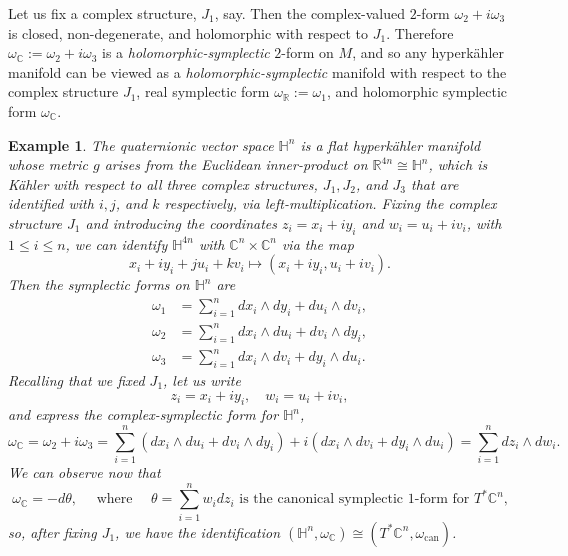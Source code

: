 \documentclass{amsart}
\newtheorem{example}{Example}
\newcommand{\w}{\omega}
\newcommand{\RR}{\mathbb{R}}
\newcommand{\CC}{\mathbb{C}}
\newcommand{\HH}{\mathbb{H}}
\begin{document}
	Let us fix a complex structure, $J_{1}$, say. Then the complex-valued $2$-form $\w_{2} + i\w_{3}$ is closed, non-degenerate, and holomorphic with respect to $J_{1}$. Therefore $\w_{\CC} := \w_{2} + i\w_{3}$ is a \emph{holomorphic-symplectic} $2$-form on $M$, and so any hyperk\"ahler manifold can be viewed as a \emph{holomorphic-symplectic} manifold with respect to the complex structure $J_{1}$, real symplectic form $\w_{\RR} := \w_{1}$, and holomorphic symplectic form $\w_{\CC}$.
	
	\begin{example}
		The quaternionic vector space $\HH^{n}$ is a flat hyperk\"ahler manifold whose metric $g$ arises from the Euclidean inner-product on $\RR^{4n}\cong \HH^{n}$, which is K\"ahler with respect to all three complex structures, $J_{1}, J_{2}$, and $J_{3}$ that are identified with $i, j$, and $k$ respectively, via left-multiplication. Fixing the complex structure $J_{1}$ and introducing the coordinates $z_{i} = x_{i} + i y_{i}$ and $w_{i} = u_{i} + i v_{i}$, with $1 \leq i \leq n$, we can identify $\HH^{4n}$ with $\CC^{n} \times \CC^{n}$ via the map
		\[
		x_{i} + iy_{i} + ju_{i} + kv_{i} \mapsto (x_{i} + iy_{i}, u_{i} + iv_{i}).
		\]
		Then the symplectic forms on $\HH^{n}$ are
		\begin{equation*}
			\begin{split}
				\w_{1} &= \sum_{i=1}^{n} dx_{i} \wedge dy_{i} + du_{i} \wedge dv_{i}, \\
				\w_{2} &= \sum_{i=1}^{n} dx_{i} \wedge du_{i} + dv_{i} \wedge dy_{i}, \\
				\w_{3} &= \sum_{i=1}^{n} dx_{i} \wedge dv_{i} + dy_{i} \wedge du_{i}.
			\end{split}
		\end{equation*}
		Recalling that we fixed $J_{1}$, let us write
		\[
		z_{i} = x_{i} + iy_{i}, \quad w_{i} = u_{i} + iv_{i},
		\]
		and express the complex-symplectic form for $\HH^{n}$,
		\[
		\w_{\CC} = \w_{2} + i\w_{3} = \sum_{i=1}^{n} \left( dx_{i} \wedge du_{i} + dv_{i} \wedge dy_{i} \right) + i \left( dx_{i} \wedge dv_{i} + dy_{i} \wedge du_{i} \right) = \sum_{i=1}^{n} dz_{i} \wedge dw_{i}.
		\]
		We can observe now that
		\[
		\w_{\CC} = -d\theta, \quad \text{ where } \quad \theta = \sum_{i=1}^{n} w_{i}dz_{i} \text{ is the canonical symplectic $1$-form for $T^{\ast}\CC^{n}$,}
		\]
		so, after fixing $J_{1}$, we have the identification $(\HH^{n}, \w_{\CC}) \cong (T^{\ast}\CC^{n}, \w_{\text{can}})$.
	\end{example}
	
\end{document}
